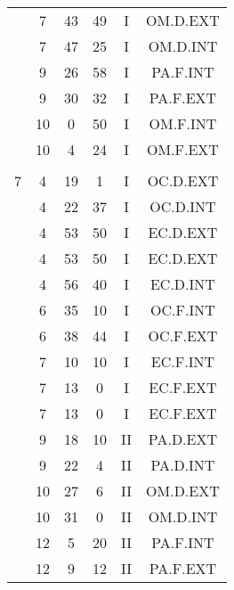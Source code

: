 \documentclass[12pt, a4paper]{article}
\begin{document}
\begin{multicols}{3}
{\begin{tabular}{c c c c c c}
	 	 	 	 & 7 & 43 & 49 & I & OM.D.EXT\\%
	 	 	 	 & 7 & 47 & 25 & I & OM.D.INT\\%
	 	 	 	 & 9 & 26 & 58 & I & PA.F.INT\\%
	 	 	 	 & 9 & 30 & 32 & I & PA.F.EXT\\%
	 	 	 	 & 10 & 0 & 50 & I & OM.F.INT\\%
	 	 	 	 & 10 & 4 & 24 & I & OM.F.EXT\\%
	 	 	 	 & & & & & \\%
	 	 	 	7 & 4 & 19 & 1 & I & OC.D.EXT\\%
	 	 	 	 & 4 & 22 & 37 & I & OC.D.INT\\%
	 	 	 	 & 4 & 53 & 50 & I & EC.D.EXT\\%
	 	 	 	 & 4 & 53 & 50 & I & EC.D.EXT\\%
	 	 	 	 & 4 & 56 & 40 & I & EC.D.INT\\%
	 	 	 	 & 6 & 35 & 10 & I & OC.F.INT\\%
	 	 	 	 & 6 & 38 & 44 & I & OC.F.EXT\\%
	 	 	 	 & 7 & 10 & 10 & I & EC.F.INT\\%
	 	 	 	 & 7 & 13 & 0 & I & EC.F.EXT\\%
	 	 	 	 & 7 & 13 & 0 & I & EC.F.EXT\\%
	 	 	 	 & 9 & 18 & 10 & II & PA.D.EXT\\%
	 	 	 	 & 9 & 22 & 4 & II & PA.D.INT\\%
	 	 	 	 & 10 & 27 & 6 & II & OM.D.EXT\\%
	 	 	 	 & 10 & 31 & 0 & II & OM.D.INT\\%
	 	 	 	 & 12 & 5 & 20 & II & PA.F.INT\\%
	 	 	 	 & 12 & 9 & 12 & II & PA.F.EXT\\%

\end{tabular}}
\end{multicols}
\end{document}
